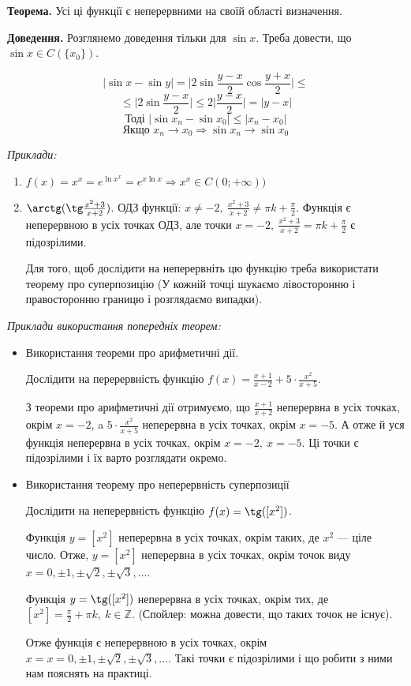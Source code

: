 \documentclass[12pt]{report}
\begin{document}
\textbf{Теорема.} Усі ці функції є неперервними на своїй області визначення. 

\textbf{Доведення.} Розглянемо доведення тільки для $\sin x$. Треба довести, що $\sin x \in C(\{x_0\})$.

$$|\sin x - \sin y| = \Big|2 \sin \frac{y-x}{2} \cos \frac{y+x}{2}\Big| \leq$$
$$\leq \Big| 2 \sin \frac{y-x}{2} \Big| \leq 2 \Big| \frac{y-x}{2} \Big| = |y - x|$$
$$\textrm{Тоді } |\sin x_n - \sin x_0| \leq |x_n - x_0|$$
$$\textrm{Якщо } x_n \to x_0 \Longrightarrow \sin x_n \to \sin x_0$$

\textit{Приклади:}
\begin{enumerate}
    \item$f(x) = x^x = e^{\ln x^x} = e^{x \ln x} \Longrightarrow x^x \in C(0; +\infty))$
    \item$\arctg (\tg \frac{x^2 + 3}{x+2})$. ОДЗ функції: $x\neq - 2,\ \frac{x^2 + 3}{x+2} \neq \pi k + \frac{\pi}{2}$. Функція є неперервною в усіх точках ОДЗ, але точки $x = - 2,\ \frac{x^2 + 3}{x+2} = \pi k + \frac{\pi}{2}$ є підозрілими.
    
    Для того, щоб дослідити на неперервніть цю функцію треба використати теорему про суперпозицію (У кожній точці шукаємо лівосторонню і правосторонню границю і розглядаємо випадки).
\end{enumerate}

\textit{Приклади використання попередніх теорем:}

\begin{itemize}
    \item Використання теореми про арифметичні дії. 
    
    Дослідити на перерервність функцію $f(x) = \frac{x+1}{x-2} + 5 \cdot \frac{x^2}{x+5}$. 
    
    З теореми про арифметичні дії отримуємо, що $\frac{x+1}{x+2}$ неперервна в усіх точках, окрім $x = -2$, a $5 \cdot \frac{x^2}{x+5}$ неперервна в усіх точках, окрім $x = -5$. А отже й уся функція неперервна в усіх точках, окрім $x=-2,\ x =-5$. Ці точки є підозрілими і їх варто розглядати окремо.
    
    \item Використання теорему про неперервність суперпозиції
    
    Дослідити на неперервність функцію $f(x) = \tg ([x^2])$.
    
    Функція $y=[x^2]$ неперервна в усіх точках, окрім таких, де $x^2$ --- ціле число. Отже, $y = [x^2]$ неперервна в усіх точках, окрім точок виду $x = 0,\pm 1, \pm \sqrt{2},\pm \sqrt{3}, \ldots$. 
    
    Функція $y = \tg ([x^2])$ неперервна в усіх точках, окрім тих, де $[x^2] = \frac{\pi}{2} + \pi k,\ k \in \mathbb{Z}$. (Спойлер: можна довести, що таких точок не існує).
    
    Отже функція є неперервною в усіх точках, окрім $x = x = 0,\pm 1, \pm \sqrt{2},\pm \sqrt{3}, \ldots$. Такі точки є підозрілими і що робити з ними нам пояснять на практиці.
\end{itemize}
\end{document}

